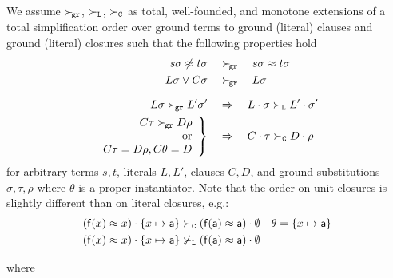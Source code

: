 \begin{definition}

    We assume \( \mathrel\succ_{\!\mathtt{gr}} \), \( \mathrel\succ_{\mathtt{L}} \), \( \mathrel\succ_{\mathtt{C}} \) as
        total, well-founded, and monotone extensions of a
        total simplification order over ground terms to ground (literal) clauses
        and ground (literal) closures such that the following properties hold
       \begin{align*}
            s\sigma\not\approx t\sigma \quad&\mathrel\succ_{\!\mathtt{gr}}\quad s\sigma\approx t\sigma
           \\
            L\sigma\lor C\sigma \quad&\mathrel\succ_{\!\mathtt{gr}}\quad L\sigma
           \\[0.7em]
            L\sigma \mathrel\succ_{\!\mathtt{gr}} L'\sigma'
           \quad&\Rightarrow\quad
            L\cdot\sigma \mathrel\succ_{\mathtt{L}} L'\cdot\sigma'
       \\
       \left.
       \begin{array}{r}
            C\tau\mathrel\succ_{\!\mathtt{gr}} D\rho
            \\
           \text{ or}
           \\
            C\tau=D\rho, C\theta=D
       \end{array}
       \right \}
           \quad&\Rightarrow\quad
            C\cdot\tau\mathrel\succ_{\mathtt{C}}{} D\cdot\rho{}
       \end{align*}
        for arbitrary terms \( s,t \),
        literals \( L, L' \),
        clauses \( C,D \), and
        ground substitutions \( \sigma, \tau, \rho \)
        where \( \theta \) is a proper instantiator.
        Note that the order on unit closures is slightly different than on literal closures, e.g.:
       \begin{align*}
            (\mathsf{f}(x)\approx x)\cdot \{ x\mapsto \mathsf{a} \}
            &\mathrel\succ_{\mathtt{C}}
            (\mathsf{f}(\mathsf{a})\approx\mathsf{a})\cdot\emptyset
            & \theta = \{ x\mapsto \mathsf{a} \}
       \\
        (\mathsf{f}(x)\approx x)\cdot \{ x\mapsto \mathsf{a} \}
        &\not\mathrel\succ_{\mathtt{L}}
        (\mathsf{f}(\mathsf{a})\approx\mathsf{a})\cdot\emptyset
       \end{align*}



\end{definition}

\begin{definition}
   
    where
   
   \end{definition}

